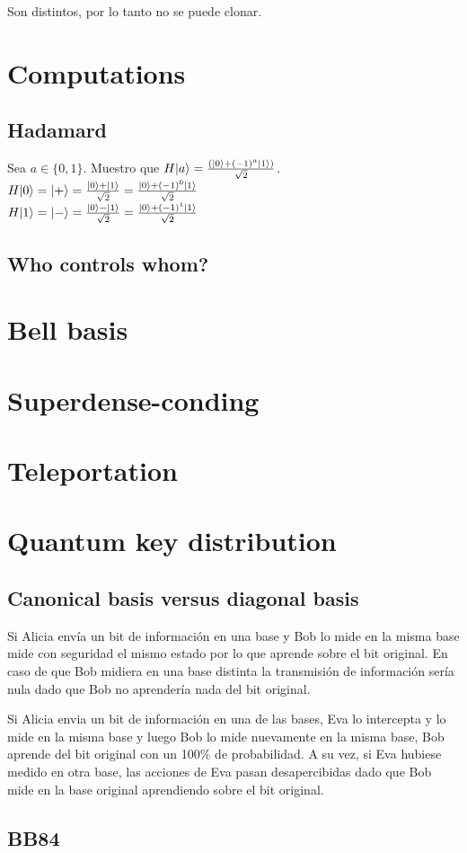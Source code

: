 \documentclass[osajnl,preprint,showpacs,superscriptaddress,10pt]{revtex4-1} %
\DeclarePairedDelimiter\ket{\lvert}{\rangle}
\begin{document}
Son distintos, por lo tanto no se puede clonar.

\section{Computations}

\subsection{Hadamard}

Sea $a \in \{0, 1\}$. Muestro que $H\ket{a} = \frac{(\ket{0} + (-1)^a \ket{1})}{\sqrt{2}}$. \\

$H\ket{0} = \ket{+} = \frac{\ket{0} + \ket{1}}{\sqrt{2}} = \frac{\ket{0} + (-1)^0\ket{1}}{\sqrt{2}}$ \\
    
$H\ket{1} = \ket{-} = \frac{\ket{0} - \ket{1}}{\sqrt{2}} = \frac{\ket{0} + (-1)^1\ket{1}}{\sqrt{2}}$

\subsection{Who controls whom?}

\section{Bell basis}

\section{Superdense-conding}

\section{Teleportation}

\section{Quantum key distribution}

\subsection{Canonical basis versus diagonal basis}

Si Alicia envía un bit de información en una base y Bob lo mide en la misma base mide con seguridad el mismo estado por lo que aprende sobre el bit original. En caso de que Bob midiera en una base distinta la transmisión de información sería nula dado que Bob no aprendería nada del bit original.

Si Alicia envia un bit de información en una de las bases, Eva lo intercepta y lo mide en la misma base y luego Bob lo mide nuevamente en la misma base, Bob aprende del bit original con un 100\% de probabilidad. A su vez, si Eva hubiese medido en otra base, las acciones de Eva pasan desapercibidas dado que Bob mide en la base original aprendiendo sobre el bit original.

\subsection{BB84}
\end{document}
